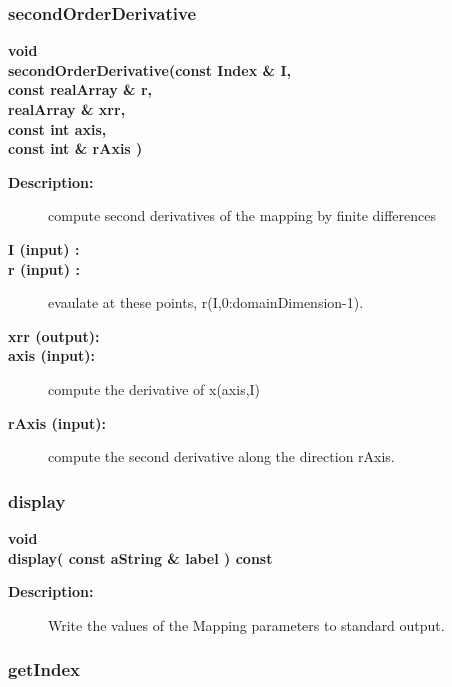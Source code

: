 \subsubsection{secondOrderDerivative}
 
\begin{flushleft} \textbf{%
void  \\ 
\settowidth{\MappingIncludeArgIndent}{secondOrderDerivative(}%
secondOrderDerivative(const Index \& I, \\ 
\hspace{\MappingIncludeArgIndent}const realArray \& r, \\ 
\hspace{\MappingIncludeArgIndent}realArray \& xrr, \\ 
\hspace{\MappingIncludeArgIndent}const int axis,\\ 
\hspace{\MappingIncludeArgIndent}const int \& rAxis )
}\end{flushleft}
\begin{description}
\item[{\bf Description:}]  compute second derivatives of the mapping by finite differences
\item[{\bf I (input) :}]  
\item[{\bf r (input) :}]  evaulate at these points, r(I,0:domainDimension-1).
\item[{\bf xrr (output):}] 
\item[{\bf axis (input):}]  compute the derivative of x(axis,I)
\item[{\bf rAxis (input):}]  compute the second derivative along the direction rAxis.
\end{description}
\subsubsection{display}
 
\begin{flushleft} \textbf{%
void  \\ 
\settowidth{\MappingIncludeArgIndent}{display(}%
display( const aString \& label ) const
}\end{flushleft}
\begin{description}
\item[{\bf Description:}] 
   Write the values of the Mapping parameters to standard output.
 
\end{description}
\subsubsection{getIndex}
 
